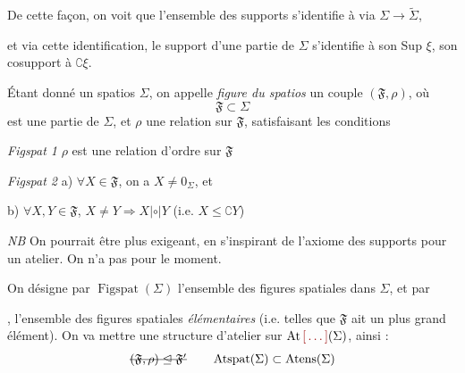 \documentclass[11pt,a4paper]{article}
\begin{document}
De cette façon, on voit que l'ensemble des supports s'identifie à
\uncertain{$\Sigma$} via $\Sigma \to \widetilde{\Sigma}$,



et via cette identification, le support d'une partie  de $\Sigma$
s'identifie à son Sup $\xi$, son cosupport à $\complement \xi$.


Étant donné un spatios $\Sigma$, on  appelle \emph{figure du
spatios} 
  un  couple $(\mathfrak{F}, \rho)$, où
\[
  \mathfrak{F} \subset \Sigma
\]
est une partie de $\Sigma$, et $\rho$ une relation sur $\mathfrak{F}$,
satisfaisant les conditions

\emph{Figspat 1} \quad $\rho$ est une relation d'ordre sur $\mathfrak{F}$

\emph{Figspat 2} \quad a) $\forall X \in \mathfrak{F}$, on a
$X \neq 0_{\Sigma}$, et

\quad b) $\forall X, Y \in \mathfrak{F}$, $X \neq Y \Longrightarrow
X \mathrel{|\circ|} Y$ (i.e. $X \leq \complement Y$)

\emph{NB} On pourrait être plus exigeant, en s'inspirant de l'axiome des
supports pour un atelier. On n'a pas  pour le moment.

On désigne par $\operatorname{Figspat}(\Sigma)$ l'ensemble des figures
spatiales dans $\Sigma$, et par


, l'ensemble des figures spatiales
\emph{élémentaires} (i.e. telles que $\mathfrak{F}$ ait un plus grand
élément). On va mettre une structure d'atelier sur
$\operatorname{At}\ill{}(\Sigma)$, ainsi :
\[
  \text{\struck{$(\mathfrak{F}, \rho) \trianglelefteq \mathfrak{F}'$}} \qquad
  \operatorname{Atspat}(\Sigma) \subset \operatorname{Atens}(\Sigma)
\]
\end{document}
